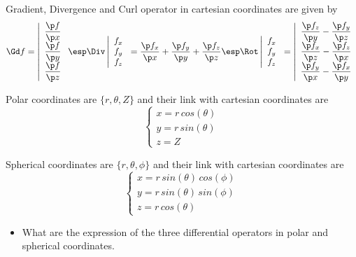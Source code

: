 
\bexo
Gradient, Divergence and Curl operator in cartesian coordinates are given by 
$$\Gd f=\left|
\begin{array}{c}
\dfrac{\p f}{\p x}\\
\dfrac{\p f}{\p y}\\
\dfrac{\p f}{\p z}
\end{array}
\right. \esp
\Div \left|
\begin{array}{c}
f_x\\
f_y\\
f_z
\end{array}
\right.=\dfrac{\p f_x}{\p x}+
\dfrac{\p f_y}{\p y}
+\dfrac{\p f_z}{\p z}
\esp
\Rot \left|
\begin{array}{c}
f_x\\
f_y\\
f_z
\end{array}\right.=
\left|
\begin{array}{c}
\dfrac{\p f_z}{\p y}-\dfrac{\p f_y}{\p z}\\
\dfrac{\p f_x}{\p z}-\dfrac{\p f_z}{\p x}\\
\dfrac{\p f_y}{\p x}-\dfrac{\p f_x}{\p y}\\
\end{array}
\right.
$$

Polar coordinates are $\{r,\theta,Z\}$ and their link with cartesian coordinates are
$$ \left\{
\begin{array}{c}
x=r\,cos(\theta)\\
y=r\,sin(\theta)\\
z=Z
\end{array}
\right.$$
 
Spherical coordinates are $\{r,\theta,\phi\}$ and their link with cartesian coordinates are
$$ \left\{
\begin{array}{c}
x=r\,sin(\theta)\,cos(\phi)\\
y=r\,sin(\theta)\,sin(\phi)\\
z=r\,cos(\theta)
\end{array}
\right.$$ 
 

\begin{itemize}
\item What are the expression of the three differential operators in polar and spherical coordinates.
\end{itemize} 
\eexo

